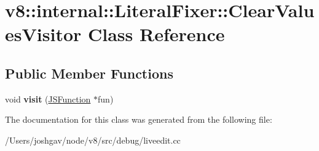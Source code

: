 \hypertarget{classv8_1_1internal_1_1_literal_fixer_1_1_clear_values_visitor}{}\section{v8\+:\+:internal\+:\+:Literal\+Fixer\+:\+:Clear\+Values\+Visitor Class Reference}
\label{classv8_1_1internal_1_1_literal_fixer_1_1_clear_values_visitor}
\subsection*{Public Member Functions}
\begin{DoxyCompactItemize}
\item 
void {\bfseries visit} (\hyperlink{classv8_1_1internal_1_1_j_s_function}{J\+S\+Function} $\ast$fun)\hypertarget{classv8_1_1internal_1_1_literal_fixer_1_1_clear_values_visitor_a1351d14bf9431250213b711ce85fcef0}{}\label{classv8_1_1internal_1_1_literal_fixer_1_1_clear_values_visitor_a1351d14bf9431250213b711ce85fcef0}

\end{DoxyCompactItemize}


The documentation for this class was generated from the following file\+:\begin{DoxyCompactItemize}
\item 
/\+Users/joshgav/node/v8/src/debug/liveedit.\+cc\end{DoxyCompactItemize}
